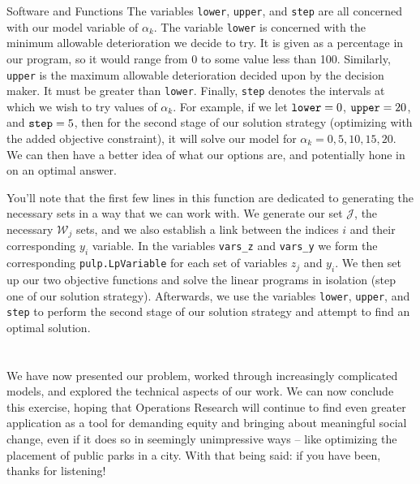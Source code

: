 \documentclass[12pt]{pom_thesis}
\theoremstyle{definition}
\begin{document}
\begin{chapter}{Software and Functions}
	The variables \verb-lower-, \verb-upper-, and \verb-step- are all concerned with our model variable of $\alpha_k$. The variable \verb-lower- is concerned with the minimum allowable deterioration we decide to try. It is given as a percentage in our program, so it would range from 0 to some value less than 100. Similarly, \verb-upper- is the maximum allowable deterioration decided upon by the decision maker. It must be greater than \verb-lower-. Finally, \verb-step- denotes the intervals at which we wish to try values of $\alpha_k$. For example, if we let $\verb-lower- = 0$, $\verb-upper- =20$, and $\verb-step-=5$, then for the second stage of our solution strategy (optimizing with the added objective constraint), it will solve our model for $\alpha_k = 0,5,10,15,20$. We can then have a better idea of what our options are, and potentially hone in on an optimal answer. 
	
	You'll note that the first few lines in this function are dedicated to generating the necessary sets in a way that we can work with. We generate our set $\mathcal{J}$, the necessary $\mathcal{W}_j$ sets, and we also establish a link between the indices $i$ and their corresponding $y_i$ variable. In the variables \verb-vars_z- and \verb-vars_y- we form the corresponding \verb-pulp.LpVariable- for each set of variables $z_j$ and $y_i$. We then set up our two objective functions and solve the linear programs in isolation (step one of our solution strategy). Afterwards, we use the variables \verb-lower-, \verb-upper-, and \verb-step- to perform the second stage of our solution strategy and attempt to find an optimal solution. \\ \\ \\

	We have now presented our problem, worked through increasingly complicated models, and explored the technical aspects of our work. We can now conclude this exercise, hoping that Operations Research will continue to find even greater application as a tool for demanding equity and bringing about meaningful social change, even if it does so in seemingly unimpressive ways -- like optimizing the placement of public parks in a city. With that being said: if you have been, thanks for listening!
\end{chapter}



\end{document}
